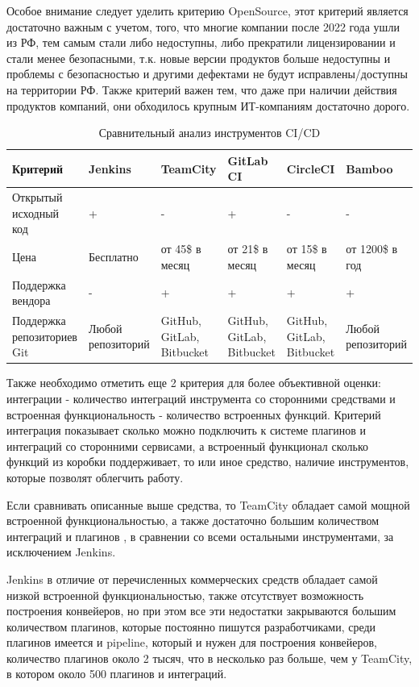 Особое внимание следует уделить критерию OpenSource, этот критерий является достаточно важным с учетом, того, что многие компании после 2022 года ушли из РФ, тем самым стали либо недоступны, либо прекратили лицензировании и стали менее безопасными, т.к. новые версии продуктов больше недоступны и проблемы с безопасностью и другими дефектами не будут исправлены/доступны на территории РФ. Также критерий важен тем, что даже при наличии действия продуктов компаний, они обходилось крупным ИТ-компаниям достаточно дорого.

\begin{table}
    \centering
    \caption{Сравнительный анализ инструментов CI/CD}
    \begin{tabular}{|p{3cm}|p{2cm}|p{2cm}|p{2cm}|p{2cm}|p{2cm}|}
    \hline
        Критерий & Jenkins & TeamCity & GitLab CI & CircleCI & Bamboo \\ \hline
        Открытый исходный код & + & - & + & - & - \\ \hline
        Цена & Бесплатно & от 45\$ в месяц \cite{cianalyze} & от 21\$ в месяц \cite{gitlabprice} & от 15\$ в месяц \cite{cianalyze} & от 1200\$ в год \cite{cianalyze} \\ \hline
        Поддержка вендора & - & + & + &+ & + \\ \hline
        Поддержка репозиториев Git & Любой репозиторий & GitHub, GitLab, Bitbucket & GitHub, GitLab, Bitbucket  & GitHub, GitLab, Bitbucket & Любой репозиторий  \\ \hline

    \end{tabular}
\end{table}	

Также необходимо отметить еще 2 критерия для более объективной оценки: интеграции - количество интеграций инструмента со сторонними средствами и встроенная функциональность - количество встроенных функций.
Критерий интеграция показывает сколько можно подключить к системе плагинов и интеграций со сторонними сервисами, а встроенный функционал сколько функций из коробки поддерживает, то или иное средство, наличие инструментов, которые позволят облегчить работу.

Если сравнивать описанные выше средства, то TeamCity обладает самой мощной встроенной функциональностью, а также достаточно большим количеством интеграций и плагинов \cite{cianalyze}, в сравнении со всеми остальными инструментами, за исключением Jenkins.

Jenkins в отличие от перечисленных коммерческих средств обладает самой низкой встроенной функциональностью, также отсутствует возможность построения конвейеров, но при этом все эти недостатки закрываются большим количеством плагинов, которые постоянно пишутся разработчиками, среди плагинов имеется и pipeline, который и нужен для построения конвейеров, количество плагинов около 2 тысяч, что в несколько раз больше, чем у TeamCity, в котором около 500 плагинов и интеграций.

